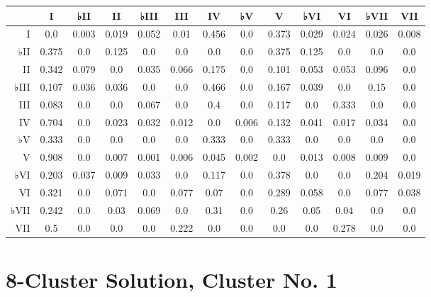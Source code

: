 \begin{table}[htbp]
\begin{minipage}{\linewidth}
\setlength{\tymax}{0.5\linewidth}
\centering
\small
\begin{tabulary}{\textwidth}{@{}RCCCCCCCCCCCC@{}} \toprule
&I&♭II&II&♭III&III&IV&♭V&V&♭VI&VI&♭VII&VII\\
\midrule
I&0.0&0.003&0.019&0.052&0.01&0.456&0.0&0.373&0.029&0.024&0.026&0.008\\
♭II&0.375&0.0&0.125&0.0&0.0&0.0&0.0&0.375&0.125&0.0&0.0&0.0\\
II&0.342&0.079&0.0&0.035&0.066&0.175&0.0&0.101&0.053&0.053&0.096&0.0\\
♭III&0.107&0.036&0.036&0.0&0.0&0.466&0.0&0.167&0.039&0.0&0.15&0.0\\
III&0.083&0.0&0.0&0.067&0.0&0.4&0.0&0.117&0.0&0.333&0.0&0.0\\
IV&0.704&0.0&0.023&0.032&0.012&0.0&0.006&0.132&0.041&0.017&0.034&0.0\\
♭V&0.333&0.0&0.0&0.0&0.0&0.333&0.0&0.333&0.0&0.0&0.0&0.0\\
V&0.908&0.0&0.007&0.001&0.006&0.045&0.002&0.0&0.013&0.008&0.009&0.0\\
♭VI&0.203&0.037&0.009&0.033&0.0&0.117&0.0&0.378&0.0&0.0&0.204&0.019\\
VI&0.321&0.0&0.071&0.0&0.077&0.07&0.0&0.289&0.058&0.0&0.077&0.038\\
♭VII&0.242&0.0&0.03&0.069&0.0&0.31&0.0&0.26&0.05&0.04&0.0&0.0\\
VII&0.5&0.0&0.0&0.0&0.222&0.0&0.0&0.0&0.0&0.278&0.0&0.0\\

\bottomrule

\end{tabulary}
\end{minipage}
\end{table}

\section{8-Cluster Solution, Cluster No. 1}
\label{8-clustersolutionclusterno.1}

